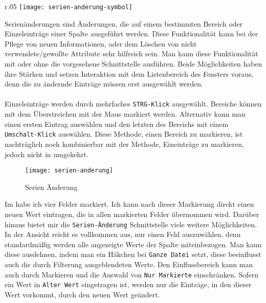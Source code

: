 \begin{wrapfigure}{r}{.05\textwidth}
	\vspace{-50pt}
	\texttt{[image: serien-anderung-symbol]}
	\vspace{-35pt}
\end{wrapfigure}

\noindent
Serienänderungen sind Änderungen, die auf einem bestimmten Bereich oder Einzeleinträge einer Spalte ausgeführt werden. Diese Funktionalität kann bei der Pflege von neuen Informationen, oder dem Löschen von nicht verwendete/gewollte Attribute sehr hilfreich sein. Man kann diese Funktionalität mit oder ohne die vorgesehene Schnittstelle ausführen. Beide Möglichkeiten haben ihre Stärken und setzen Interaktion mit dem Listenbereich des Fensters voraus, denn die zu ändernde Einträge müssen erst ausgewählt werden.\\
\\
Einzeleinträge werden durch mehrfaches \texttt{STRG-Klick} ausgewählt. Bereiche können mit dem Überstreichen mit der Maus markiert werden. Alternativ kann man einen ersten Eintrag auswählen und den letzten des Bereichs mit einem \texttt{Umschalt-Klick} auswählen. Diese Methode, einen Bereich zu markieren, ist nachträglich noch kombinierbar mit der Methode, Eineinträge zu markieren, jedoch nicht in umgekehrt.\\

\begin{figure}[h]
	\texttt{[image: serien-anderung]}
	\vspace{-15pt}
	\caption{Serien Änderung}
	\label{fig:serien-anderung}
\end{figure}

\noindent
Im  habe ich vier Felder markiert. Ich kann nach dieser Markierung direkt einen neuen Wert eintragen, die in allen markierten Felder übernommen wird. Darüber hinaus bietet mir die \texttt{Serien-Änderung} Schnittstelle viele weitere Möglichkeiten. In der Ansicht reicht es vollkommen aus, nur einen Feld auszuwählen, denn standardmäßig werden alle angezeigte Werte der Spalte miteinbezogen. Man kann diese ausdehnen, indem man ein Häkchen bei \texttt{Ganze Datei} setzt, diese beeinflusst auch die durch Filterung ausgeblendeten Werte. Den Einflussbereich kann man auch durch Markieren und die Auswahl von \texttt{Nur Markierte} einschränken. Sofern ein Wert in \texttt{Alter Wert} eingetragen ist, werden nur die Einträge, in den dieser Wert vorkommt, durch den neuen Wert geändert. 

